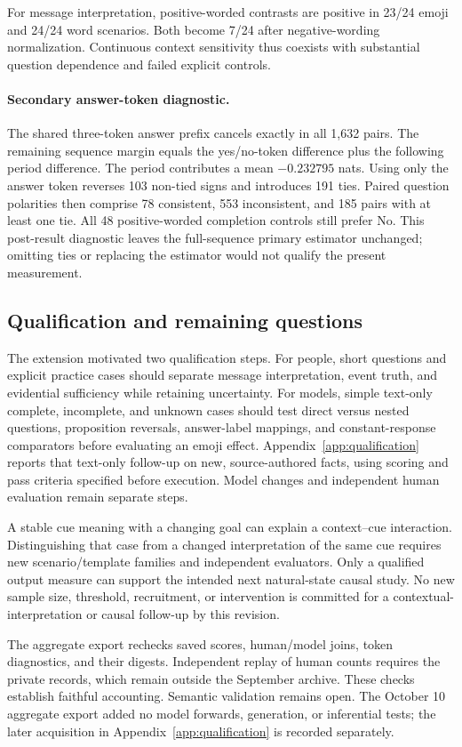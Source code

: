For message interpretation, positive-worded contrasts are positive in 23/24
emoji and 24/24 word scenarios. Both become 7/24 after negative-wording
normalization. Continuous context sensitivity thus coexists with substantial
question dependence and failed explicit controls.

\paragraph{Secondary answer-token diagnostic.}
The shared three-token answer prefix cancels exactly in all 1,632 pairs.
The remaining sequence margin equals the yes/no-token difference plus the
following period difference. The period contributes a mean $-0.232795$ nats.
Using only the answer token reverses 103 non-tied signs and introduces
191 ties. Paired question polarities then comprise 78 consistent, 553
inconsistent, and 185 pairs with at least one tie. All 48 positive-worded
completion controls still prefer No. This post-result diagnostic leaves the
full-sequence primary estimator unchanged; omitting ties or replacing the
estimator would not qualify the present measurement.



\subsection{Qualification and remaining questions}
\label{app:contextual-next}

The extension motivated two qualification steps. For people, short questions
and explicit practice cases should separate message interpretation, event
truth, and evidential sufficiency while retaining uncertainty. For models,
simple text-only complete, incomplete, and unknown cases should test direct
versus nested questions, proposition reversals, answer-label mappings, and
constant-response comparators before evaluating an emoji effect.
Appendix~\ref{app:qualification} reports that text-only follow-up on new,
source-authored facts, using scoring and pass criteria specified before
execution. Model changes and independent human evaluation remain separate steps.

A stable cue meaning with a changing goal can explain a context--cue
interaction. Distinguishing that case from a changed interpretation of the
same cue requires new scenario/template families and independent evaluators.
Only a qualified output measure can support the intended next natural-state
causal study. No new sample size, threshold, recruitment, or intervention is
committed for a contextual-interpretation or causal follow-up by this revision.

The aggregate export rechecks saved scores, human/model joins, token diagnostics,
and their digests. Independent replay of human counts requires the private
records, which remain outside the September archive. These checks establish
faithful accounting. Semantic validation remains open. The October 10 aggregate
export added no model forwards, generation, or inferential tests; the later
acquisition in Appendix~\ref{app:qualification} is recorded separately.
